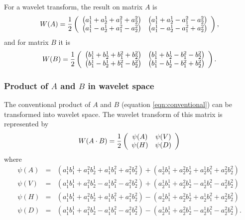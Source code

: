 For a wavelet transform, the result on matrix $A$ is
\begin{equation} \label{WA} \displaystyle
W(A) = 
{1 \over 2} 
\left(\begin{array}{cc}  
\left(a^1_1 + a^1_2 + a^2_1 + a^2_2\right) & 
\left(a^1_1 + a^1_2 - a^2_1 - a^2_2\right)  \\ 
\left(a^1_1 - a^1_2 + a^2_1 - a^2_2\right) & 
\left(a^1_1 - a^1_2 - a^2_1 + a^2_2\right)   
\end{array}\right), 
\end{equation}
and for matrix $B$ it is
\begin{equation} \label{WB} \displaystyle
W(B) = {1 \over 2} 
\left(\begin{array}{cc}
\left(b^1_1 + b^1_2 + b^2_1 + b^2_2\right) &
\left(b^1_1 + b^1_2 - b^2_1 - b^2_2\right) \\ 
\left(b^1_1 - b^1_2 + b^2_1 - b^2_2\right) &  
\left(b^1_1 - b^1_2 - b^2_1 + b^2_2\right)
\end{array}\right).
\end{equation}

\subsubsection{Product of $A$ and $B$ in wavelet space}

The conventional product of $A$ and $B$ (equation \ref{eqn:conventional}) can be transformed into wavelet space. The wavelet transform of this matrix is represented by 
\[
W(A \cdot B) =
{1 \over 2}
\left(
\begin{array}{cc}
\psi(A) & \psi(V) \\
\psi(H) & \psi(D)
\end{array}
\right)
\]
where 
\begin{eqnarray}
\label{eqn:abwavelet1}
\psi(A) &=& (a^1_1 b^1_1 + a^2_1 b^1_2 + a^1_1b^2_1 + a^2_1  b^2_2) + (a^1_2 b^1_1 + a^2_2 b^1_2 + a^1_2 b^2_1 + a^2_2 b^2_2)\\
\label{eqn:abwavelet2}
\psi(V) &=&(a^1_1 b^1_1 + a^2_1 b^1_2  - a^1_1b^2_1 - a^2_1  b^2_2) +  (a^1_2 b^1_1 + a^2_2 b^1_2 - a^1_2 b^2_1 - a^2_2 b^2_2 ) \\
\label{eqn:abwavelet3}
\psi(H) &=& (a^1_1 b^1_1 + a^2_1 b^1_2 + a^1_1b^2_1 + a^2_1  b^2_2) - (a^1_2 b^1_1 + a^2_2 b^1_2 + a^1_2 b^2_1 + a^2_2 b^2_2)\\
\label{eqn:abwavelet4}
\psi(D) &=& (a^1_1 b^1_1 + a^2_1 b^1_2  - a^1_1b^2_1 - a^2_1  b^2_2) - (a^1_2 b^1_1 + a^2_2 b^1_2 - a^1_2 b^2_1 - a^2_2 b^2_2 ).
\end{eqnarray}

